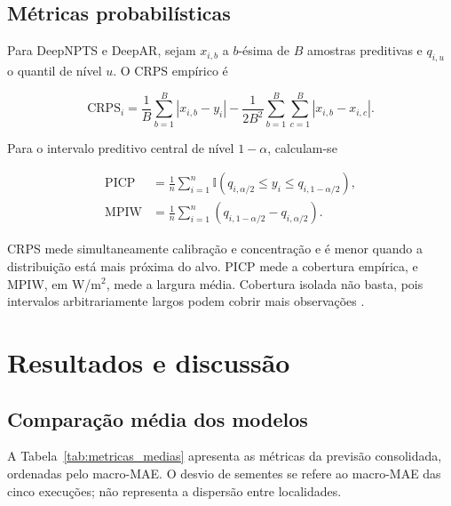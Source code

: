 \documentclass[10pt,conference,a4paper]{IEEEtran}
\begin{document}
\subsection{Métricas probabilísticas}

Para DeepNPTS e DeepAR, sejam $x_{i,b}$ a $b$-ésima de $B$ amostras
preditivas e $q_{i,u}$ o quantil de nível $u$. O CRPS empírico é
\cite{gneiting2007}

\begin{equation}
 \mathrm{CRPS}_i=
 \frac{1}{B}\sum_{b=1}^{B}|x_{i,b}-y_i|
 -\frac{1}{2B^2}\sum_{b=1}^{B}\sum_{c=1}^{B}|x_{i,b}-x_{i,c}|.
 \label{eq:crps}
\end{equation}

Para o intervalo preditivo central de nível $1-\alpha$, calculam-se

\begin{align}
 \mathrm{PICP}
 &=\frac{1}{n}\sum_{i=1}^{n}
 \mathbb{I}\!\left(q_{i,\alpha/2}\le y_i\le q_{i,1-\alpha/2}\right),
 \label{eq:picp}\\
 \mathrm{MPIW}
 &=\frac{1}{n}\sum_{i=1}^{n}
 \left(q_{i,1-\alpha/2}-q_{i,\alpha/2}\right).
 \label{eq:mpiw}
\end{align}

CRPS mede simultaneamente calibração e concentração e é menor quando a
distribuição está mais próxima do alvo. PICP mede a cobertura empírica, e MPIW,
em W/m$^2$, mede a largura média. Cobertura isolada não basta, pois intervalos
arbitrariamente largos podem cobrir mais observações \cite{gneiting2007}.

\section{Resultados e discussão}
\label{sec:resultados}

\subsection{Comparação média dos modelos}

A Tabela~\ref{tab:metricas_medias} apresenta as métricas da previsão
consolidada, ordenadas pelo macro-MAE. O desvio de sementes se refere ao
macro-MAE das cinco execuções; não representa a dispersão entre localidades.
\end{document}
